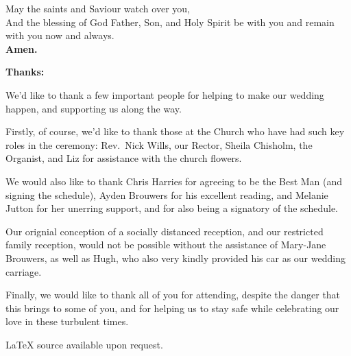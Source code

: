 \documentclass[a5paper,12pt,titlepage]{article}
\begin{document}
May the saints and Saviour watch over you, \\[0.25em]

And the blessing of God Father, Son, and Holy Spirit be with you and remain with you now and always.\\

{\bf Amen.}

\clearpage

{\bf Thanks:}

\hspace{2em} We'd like to thank a few important people for helping to make our wedding happen, and supporting us along the way.


\hspace{2em} Firstly, of course, we'd like to thank those at the Church who have had such key roles in the ceremony: Rev.~Nick Wills, our Rector, Sheila Chisholm, the Organist, and Liz for assistance with the church flowers. 


\hspace{2em} We would also like to thank Chris Harries for agreeing to be the Best Man (and signing the schedule), Ayden Brouwers for his excellent reading, and Melanie Jutton for her unerring support, and for also being a signatory of the schedule. 

\hspace{2em} Our orignial conception of a socially distanced reception, and our restricted family reception, would not be possible without the assistance of Mary-Jane Brouwers, as well as Hugh, who also very kindly provided his car as our wedding carriage. 

\hspace{2em} Finally, we would like to thank all of you for attending, despite the danger that this brings to some of you, and for helping us to stay safe while celebrating our love in these turbulent times. 

\vspace{\fill}

\begin{center}
{\tiny \LaTeX \hspace{0.05em} source available upon request.}

\end{center}
\end{document}
